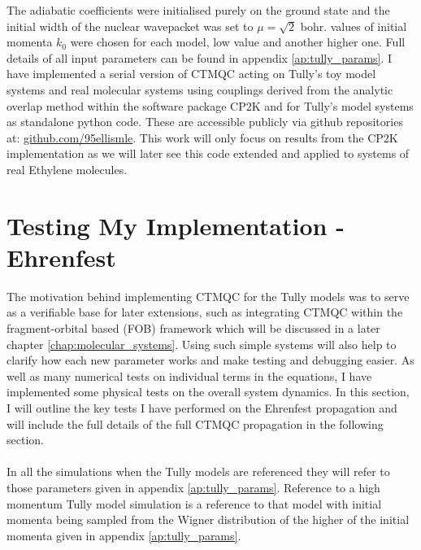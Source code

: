 The adiabatic coefficients were initialised purely on the ground state and the initial width of the nuclear wavepacket was set to $\mu = \sqrt{2}$ bohr.   values of initial momenta $k_0$ were chosen for each model,  low value and another higher one. Full details of all input parameters can be found in appendix \ref{ap:tully_params}. I have implemented a serial version of CTMQC acting on Tully's toy model systems and real molecular systems using couplings derived from the analytic overlap method \cite{gajdos_ultrafast_2014} within the software package CP2K \cite{cp2k} and for Tully's model systems as standalone python code. These are accessible publicly via github repositories at: \href{https://github.com/95ellismle}{github.com/95ellismle}. This work will only focus on results from the CP2K implementation as we will later see this code extended and applied to systems of real Ethylene molecules.

\section{Testing My Implementation -Ehrenfest}
The motivation behind implementing CTMQC for the Tully models was to serve as a verifiable base for later extensions, such as integrating CTMQC within the fragment-orbital based (FOB) \cite{spencer_fob-sh:_2016} framework which will be discussed in a later chapter \ref{chap:molecular_systems}. Using such simple systems will also help to clarify how each new parameter works and make testing and debugging easier. As well as many numerical tests on individual terms in the equations,  I have implemented some physical tests on the overall system dynamics. In this section, I will outline the key tests I have performed on the Ehrenfest propagation and will include the full details of the full CTMQC propagation in the following section.
\\\\
In all the simulations when the Tully models are referenced they will refer to those parameters given in appendix \ref{ap:tully_params}. Reference to a high momentum Tully model simulation is a reference to that model with initial momenta being sampled from the Wigner distribution of the higher of the  initial momenta given in appendix \ref{ap:tully_params}.

